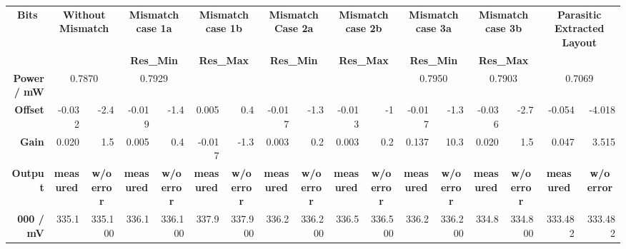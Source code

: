 \documentclass[parskip,oneside,colorbacktitle,10pt,accentcolor=tud1b,table]{tudreport}
\begin{document}
{\begin{table}
\tiny
  \centering
    \begin{tabular}{|r|r|r|r|r|r|r|r|r|r|r|r|r|r|r|r|r|}
    \hline
\multicolumn{1}{|c|}{\textbf{Bits}} & \multicolumn{2}{c|}{\textbf{Without Mismatch}} & \multicolumn{2}{c}{\textbf{Mismatch case 1a}} & \multicolumn{2}{c|}{\textbf{Mismatch case 1b}} & \multicolumn{2}{c}{\textbf{Mismatch Case 2a}} & \multicolumn{2}{c|}{\textbf{Mismatch case 2b}} & \multicolumn{2}{c}{\textbf{Mismatch case 3a}} & \multicolumn{2}{c|}{\textbf{Mismatch case 3b}} & \multicolumn{2}{c|}{\textbf{Parasitic Extracted Layout}} \\
    \textbf{} & \multicolumn{2}{c|}{\textbf{}} & \multicolumn{2}{c}{\textbf{Res\_Min}} & \multicolumn{2}{c|}{\textbf{Res\_Max}} & \multicolumn{2}{c}{\textbf{Res\_Min}} & \multicolumn{2}{c|}{\textbf{Res\_Max}} & \multicolumn{2}{c}{\textbf{Res\_Min}} & \multicolumn{2}{c|}{\textbf{Res\_Max}} & \multicolumn{1}{r}{\textbf{}} & \textbf{} \\
    \hline
    \textbf{Power / mW} & \multicolumn{2}{c|}{0.7870} & \multicolumn{2}{c|}{0.7929} & \multicolumn{2}{c|}{} & \multicolumn{2}{c|}{} & \multicolumn{2}{c|}{} & \multicolumn{2}{c|}{0.7950} & \multicolumn{2}{c|}{0.7903} & \multicolumn{2}{c|}{0.7069} \\
    \hline
    \textbf{Offset} & -0.032 & -2.4 & -0.019 & -1.4 & 0.005 & 0.4 & -0.017 & -1.3 & -0.013 & -1 & -0.017 & -1.3 & -0.036 & -2.7 & -0.054 & -4.018 \\
    \hline
    \textbf{Gain} & 0.020 & 1.5 & 0.005 & 0.4 & -0.017 & -1.3 & 0.003 & 0.2 & 0.003 & 0.2 & 0.137 & 10.3 & 0.020 & 1.5 & 0.047 & 3.515 \\
    \hline
 \multicolumn{1}{|r}{\textbf{Output}} & \multicolumn{1}{c}{\textbf{measured}} & \multicolumn{1}{c}{\textbf{w/o error}} & \multicolumn{1}{c}{\textbf{measured}} & \multicolumn{1}{c}{\textbf{w/o error}} & \multicolumn{1}{c}{\textbf{measured}} & \multicolumn{1}{c}{\textbf{w/o error}} & \multicolumn{1}{c}{\textbf{measured}} & \multicolumn{1}{c}{\textbf{w/o error}} & \multicolumn{1}{c}{\textbf{measured}} & \multicolumn{1}{c}{\textbf{w/o error}} & \multicolumn{1}{c}{\textbf{measured}} & \multicolumn{1}{c}{\textbf{w/o error}} & \multicolumn{1}{c}{\textbf{measured}} & \multicolumn{1}{c}{\textbf{w/o error}} & \multicolumn{1}{c}{\textbf{measured}} & \multicolumn{1}{c|}{\textbf{w/o error}} \\
    \hline
    \textbf{000 / mV} & 335.1 & 335.100 & 336.1 & 336.100 & 337.9 & 337.900 & 336.2 & 336.200 & 336.5 & 336.500 & 336.2 & 336.200 & 334.8 & 334.800 & 333.482 & 333.482 \\

\end{tabular}
\end{table}}
\end{document}
